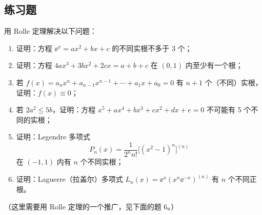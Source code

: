 \subsection{练习题}

\begin{xexercise}[1]
用 Rolle 定理解决以下问题：
\begin{enumerate}[label=(\arabic*)]
  \item 证明：方程 $\ee^x=ax^2+bx+c$ 的不同实根不多于 3 个；
  \item 证明：方程 $4ax^3+3bx^2+2cx=a+b+c$ 在 $(0,1)$ 内至少有一个根；
  \item 若 $f(x)=a_nx^n+a_{n-1}x^{n-1}+\cdots+a_1x+a_0=0$ 有 $n+1$ 个（不同）实根，证明：$f(x)\equiv0$；
  \item 若 $2a^2\leqslant5b$，证明：方程 $x^5+ax^4+bx^3+cx^2+dx+e=0$ 不可能有 5 个不同的实根；
  \item 证明：Legendre 多项式
  \[
    P_n(x)=\frac{1}{2^n n!}\bigl[(x^2-1)^n\bigr]^{(n)}
  \]
  在 $(-1,1)$ 内有 $n$ 个不同实根；
  \item 证明：Laguerre（拉盖尔）多项式 $L_n(x)=\ee^x(x^n\ee^{-x})^{(n)}$ 有 $n$ 个不同正根。
\end{enumerate}
（这里需要用 Rolle 定理的一个推广，见下面的题 6。）
\end{xexercise}

